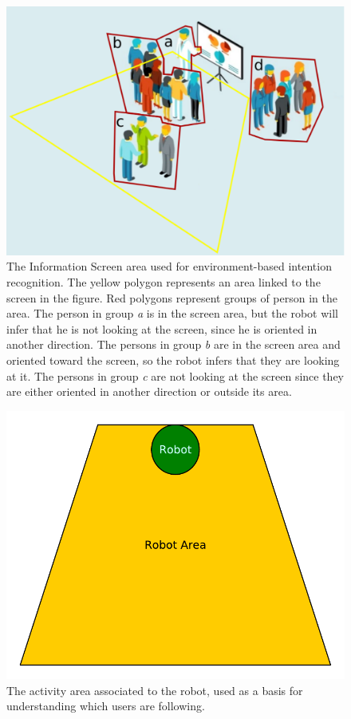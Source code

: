 \begin{figure}[ht!]
	\centering
	\includegraphics[scale=0.45]{img/case_study/spencer/environment_intention.pdf}
	\caption[Environment-Based Situation Assessment]{The Information Screen area used for environment-based intention recognition. The yellow polygon represents an area linked to the screen in the figure. Red polygons represent groups of person in the area. The person in group \textit{a} is in the screen area, but the robot will infer that he is not looking at the screen, since he is oriented in another direction. The persons in group \textit{b} are in the screen area and oriented toward the screen, so the robot infers that they are looking at it. The persons in group \textit{c} are not looking at the screen since they are either oriented in another direction or outside its area.}
	\label{fig:spencer-screen_area}
\end{figure}

\begin{figure}[ht!]
	\centering
	\includegraphics[scale=0.45]{img/case_study/spencer/robot_area.pdf}
	\caption[Environment-Based Situation Assessment 2]{The activity area associated to the robot, used as a basis for understanding which users are following.}
	\label{fig:spencer-robot_area}
\end{figure}

